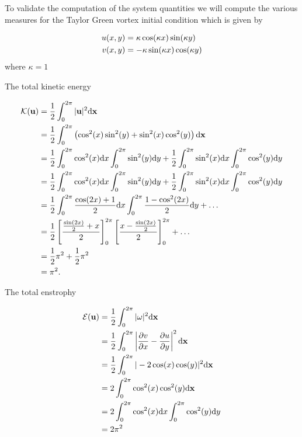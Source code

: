 \documentclass[9pt]{article}
\newcommand{\pder}[2]{\frac{\partial #1}{\partial #2}}               %
\newcommand{\bfu}{\mathbf{u}}											%
\newcommand{\bfx}{\mathbf{x}}								%
\begin{document}
To validate the computation of the system quantities we will compute the various measures for the Taylor Green vortex initial condition which is given by

\begin{align}
u(x, y) &= \kappa\cos(\kappa x)\sin(\kappa y) \notag \\
v(x, y) &= -\kappa\sin(\kappa x)\cos(\kappa y)
\label{eq:taylor_green}
\end{align}
where $\kappa = 1$ 

The total kinetic energy

\begin{align}
\mathcal{K}(\bfu) &= \frac{1}{2}\int_0^{2\pi}|\bfu |^2 \mathrm{d}\bfx \notag \\
									&= \frac{1}{2}\int_0^{2\pi}\left(\cos^2(x)\sin^2(y) + \sin^2(x)\cos^2(y)\right) \mathrm{d}\bfx \notag \\
									&= \frac{1}{2}\int_0^{2\pi}\cos^2(x)\mathrm{d}x\int_0^{2\pi}\sin^2(y)\mathrm{d}y + \frac{1}{2}\int_0^{2\pi}\sin^2(x)\mathrm{d}x\int_0^{2\pi}\cos^2(y)\mathrm{d}y \notag \\
									&= \frac{1}{2}\int_0^{2\pi}\cos^2(x)\mathrm{d}x\int_0^{2\pi}\sin^2(y)\mathrm{d}y + \frac{1}{2}\int_0^{2\pi}\sin^2(x)\mathrm{d}x\int_0^{2\pi}\cos^2(y)\mathrm{d}y \notag \\
									&= \frac{1}{2}\int_0^{2\pi}\frac{\cos(2x) + 1}{2}\mathrm{d}x\int_0^{2\pi}\frac{1 - \cos^2(2x)}{2}\mathrm{d}y + \ldots \notag \\
									&= \frac{1}{2}\left[\frac{\frac{\sin(2x)}{2} + x}{2}\right]_0^{2\pi} \left[\frac{x - \frac{\sin(2x)}{2}}{2}\right]_0^{2\pi} + \ldots  \notag \\
									&= \frac{1}{2}\pi^2 + \frac{1}{2}\pi^2 \notag \\
									&= \pi^2.
\end{align}

The total enstrophy

\begin{align}
\mathcal{E}(\bfu) &= \frac{1}{2}\int_0^{2\pi} |\omega|^2\mathrm{d}\bfx \notag \\
									&= \frac{1}{2}\int_0^{2\pi} \left|\pder{v}{x} - \pder{u}{y}\right|^2 \mathrm{d}\bfx \notag \\
									&= \frac{1}{2}\int_0^{2\pi} |-2 \cos(x)\cos(y)|^2 \mathrm{d}\bfx \notag \\
									&= 2\int_0^{2\pi} \cos^2(x)\cos^2(y) \mathrm{d}\bfx \notag \\
									&= 2\int_0^{2\pi} \cos^2(x)\mathrm{d}x\int_0^{2\pi}\cos^2(y) \mathrm{d}y \notag \\
									&= 2 \pi^2
\end{align}
\end{document}
